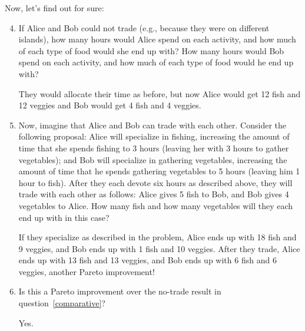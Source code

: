 \documentclass{article}
\newcommand{\myskip}{\vspace{.1in}}
\begin{document}
\clearpage

\noindent Now, let's find out for sure:

    \begin{enumerate}
    \setcounter{enumi}{3}
    \item \label{comparative} If Alice and Bob could not trade (e.g., because they were on different islands), how many hours would Alice spend on each activity, and how much of each type of food would she end up with? How many hours would Bob spend on each activity, and how much of each type of food would he end up with? %
\myskip

\begin{KEY}
They would allocate their time as before, but now Alice would get 12 fish and 12 veggies and Bob would get 4 fish and 4 veggies.
\end{KEY}

    \item Now, imagine that Alice and Bob can trade with each other. Consider the following proposal: Alice will specialize in fishing, increasing the amount of time that she spends fishing to 3 hours (leaving her with 3 hours to gather vegetables); and Bob will specialize in gathering vegetables, increasing the amount of time that he spends gathering vegetables to 5 hours (leaving him 1 hour to fish). After they each devote six hours as described above, they will trade with each other as follows: Alice gives 5 fish to Bob, and Bob gives 4 vegetables to Alice. How many fish and how many vegetables will they each end up with in this case?
\myskip

\begin{KEY}
If they specialize as described in the problem, Alice ends up with 18 fish and 9 veggies, and Bob ends up with 1 fish and 10 veggies. After they trade, Alice ends up with 13 fish and 13 veggies, and Bob ends up with 6 fish and 6 veggies, another Pareto improvement! 
\end{KEY}


    \item Is this a Pareto improvement over the no-trade result in question~\ref{comparative}? %
\myskip

\begin{KEY}
Yes.
\end{KEY}

    \end{enumerate}

\vspace{1in}
\end{document}
